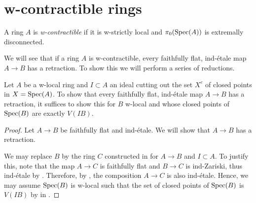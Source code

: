 \section{w-contractible rings}

\begin{definition}
    A ring \(A\) is \emph{w-contractible} if it is w-strictly local and $\pi_0(\mathrm{Spec}(A))$
    is extremally disconnected.
    \label{def:w-contractible-ring}
    \leanok
\end{definition}

We will see that if a ring $A$ is w-contractible, every faithfully flat, ind-étale map $A \to B$ has a retraction. To show
this we will perform a series of reductions.

\begin{lemma}
    \label{thm:w-contractible-if-ind-etale-plus-c-has-retraction}
    Let \(A\) be a w-local ring and $I \subset A$ an ideal cutting out the set $X^c$ of closed points
    in $X = \operatorname{Spec} (A)$. To show that every faithfully flat, ind-étale map $A \to B$ has a
    retraction, it suffices to show this for \(B\) w-local and whose
    closed points of \(\operatorname{Spec} (B)\) are exactly \(V(IB)\).
\end{lemma}

\begin{proof}
  Let $A \to B$ be faithfully flat and ind-étale.
  We will show that $A \to B$ has a retraction.

  We may replace $B$ by the ring $C$ constructed in  for $A \to B$ and $I \subset A$. To justify this, note that the map \(A \to C\) is faithfully flat and \(B \to C\) is ind-Zariski, thus ind-étale by . Therefore, by , the composition \( A \to C \) is also ind-étale. Hence, we may assume $\operatorname{Spec} (B)$ is w-local such that the set of closed points of $\operatorname{Spec} (B)$ is $V(IB)$ by  in .
\end{proof}

